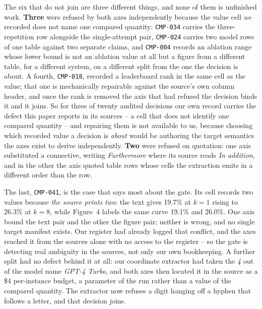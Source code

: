 The six that do not join are three different things, and none of them is unfinished work. \textbf{Three} were refused by both axes independently because the value cell
\emph{we} recorded does not name one compared quantity: \texttt{CMP-034} carries the
three-repetition row alongside the single-attempt pair, \texttt{CMP-024} carries two model rows
of one table against two separate claims, and \texttt{CMP-004} records an ablation range whose
lower bound is not an ablation value at all but a figure from a different table, for a different
system, on a different split from the one the decision is about. A fourth, \texttt{CMP-018},
recorded a leaderboard rank in the same cell as the value; that one is mechanically repairable
against the source's own column header, and once the rank is removed the axis that had refused
the decision binds it and it joins. So for three of twenty audited decisions our own record
carries the defect this paper reports in its sources -- a cell that does not identify one
compared quantity -- and repairing them is not available to us, because choosing which recorded
value a decision is \emph{about} would be authoring the target semantics the axes exist to
derive independently. \textbf{Two} were refused on quotation: one axis substituted a connective,
writing \emph{Furthermore} where its source reads \emph{In addition}, and in the other the axis
quoted table rows whose cells the extraction emits in a different order than the row.

The last, \texttt{CMP-041}, is the case that says most about the gate. Its cell records two
values because \emph{the source prints two}: the text gives 19.7\% at $k{=}1$ rising to 26.3\%
at $k{=}8$, while Figure~4 labels the same curve 19.1\% and 26.0\%. One axis bound the text pair
and the other the figure pair; neither is wrong, and no single target manifest exists. Our
register had already logged that conflict, and the axes reached it from the sources alone with
no access to the register -- so the gate is detecting real ambiguity in the sources, not only
our own bookkeeping. A further split had no defect behind it at all: our coordinate extractor
had taken the \emph{4} out of the model name \emph{GPT-4 Turbo}, and both axes then located it
in the source as a \$4 per-instance budget, a parameter of the run rather than a value of the
compared quantity. The extractor now refuses a digit hanging off a hyphen that follows a
letter, and that decision joins.

